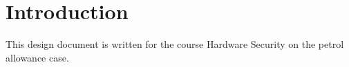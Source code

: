 
\section*{Introduction}
\label{introduction}
This design document is written for the course Hardware Security on the petrol allowance case. 
